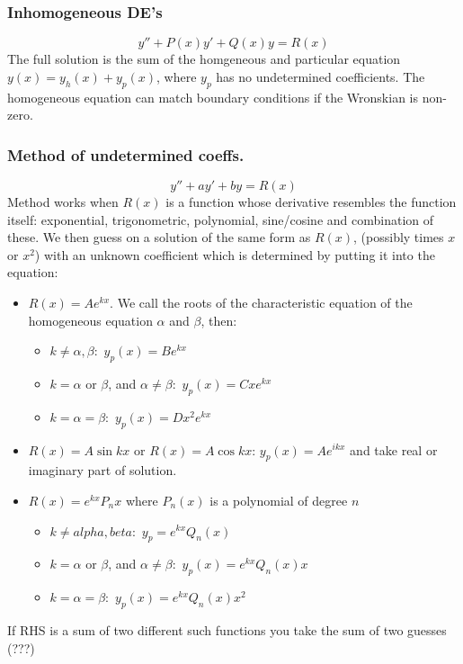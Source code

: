 \documentclass[a4paper, 10pt]{article}
\begin{document}
\begin{multicols*}{3}
\subsubsection*{Inhomogeneous DE's}
$$y'' + P(x)y' +Q(x)y = R(x)$$
The full solution is the sum of the homgeneous and particular equation $y(x)=y_{h}(x)+y_p(x)$, where $y_p$ has no undetermined coefficients. The homogeneous equation can match boundary conditions if the Wronskian is non-zero.

\subsubsection*{\small Method of undetermined coeffs.}
$$ y'' + ay' + by = R(x)$$
Method works when $R(x)$ is a function whose derivative resembles the function itself: exponential, trigonometric, polynomial, sine/cosine and combination of these. We then guess on a solution of the same form as $R(x)$, (possibly times $x$ or $x^2$) with an unknown coefficient which is determined by putting it into the equation:
\begin{itemize}
  \item $R(x) = Ae^{kx}$. We call the roots of the characteristic equation of the homogeneous equation $\alpha$ and $\beta$, then:
    \begin{itemize}
      \item $k\neq \alpha, \beta:$ $y_p(x) = Be^{kx}$
      \item $k=\alpha \text{ or } \beta$, and $\alpha\neq\beta:$ $y_p(x) = Cxe^{kx}$
      \item $k=\alpha=\beta:$ $y_p(x) = Dx^2e^{kx}$
    \end{itemize}
  \item $R(x) = A\sin{kx}$ or $R(x) = A\cos{kx}$: $y_p(x) = Ae^{ikx}$ and take real or imaginary part of solution.
  \item $R(x) = e^{kx} P_n{x}$ where $P_n(x)$ is a polynomial of degree $n$
  \begin{itemize}
    \item $k\neq alpha, beta:$ $y_p = e^{kx}Q_n(x)$
    \item $k=\alpha \text{ or } \beta$, and $\alpha\neq\beta:$ $y_p(x) = e^{kx}Q_n(x)x$
    \item $k=\alpha=\beta:$ $y_p(x) = e^{kx}Q_{n}(x)x^2$
  \end{itemize}
\end{itemize}
If RHS is a sum of two different such functions you take the sum of two guesses (???)


\end{multicols*}
\end{document}
